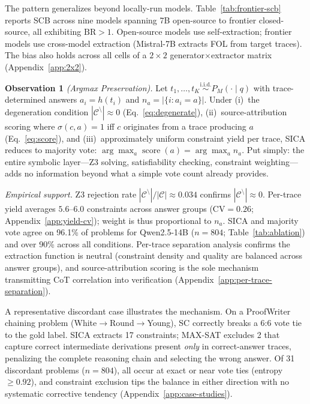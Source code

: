  The pattern generalizes beyond locally-run models. Table~\ref{tab:frontier-scb} reports SCB across nine models spanning 7B open-source to frontier closed-source, all exhibiting $\text{BR} > 1$. Open-source models use self-extraction; frontier models use cross-model extraction (Mistral-7B extracts FOL from target traces). The bias also holds across all cells of a $2{\times}2$ generator${\times}$extractor matrix (Appendix~\ref{app:2x2}).

\smallskip\noindent
\textbf{Observation 1} \textit{(Argmax Preservation).}\;%
Let $t_1, \ldots, t_K \overset{\mathrm{i.i.d.}}{\sim} P_M(\cdot \mid q)$ with trace-determined answers $a_i = h(t_i)$ and $n_a = |\{i : a_i = a\}|$.
Under (i)~the degeneration condition $|\mathcal{C}^{\setminus}| \approx 0$ (Eq.~\ref{eq:degenerate}), (ii)~source-attribution scoring where $\sigma(c,a) {=} 1$ iff $c$ originates from a trace producing $a$ (Eq.~\ref{eq:score}), and (iii)~approximately uniform constraint yield per trace, SICA reduces to majority vote: $\arg\max_a \operatorname{score}(a) = \arg\max_a n_a$.
Put simply: the entire symbolic layer---Z3 solving, satisfiability checking, constraint weighting---adds no information beyond what a simple vote count already provides.

\smallskip\noindent
\textit{Empirical support.}\;%
Z3 rejection rate $|\mathcal{C}^{\setminus}|/|\mathcal{C}| \approx 0.034$ confirms $|\mathcal{C}^{\setminus}| \approx 0$. Per-trace yield averages $5.6$--$6.0$ constraints across answer groups (CV${=}0.26$; Appendix~\ref{app:yield-cv}); weight is thus proportional to $n_a$. SICA and majority vote agree on 96.1\% of problems for Qwen2.5-14B ($n{=}804$; Table~\ref{tab:ablation}) and over 90\% across all conditions. Per-trace separation analysis confirms the extraction function is neutral (constraint density and quality are balanced across answer groups), and source-attribution scoring is the sole mechanism transmitting CoT correlation into verification (Appendix~\ref{app:per-trace-separation}).

 A representative discordant case illustrates the mechanism. On a ProofWriter chaining problem (White$\to$Round$\to$Young), SC correctly breaks a 6:6 vote tie to the gold label. SICA extracts 17 constraints; MAX-SAT excludes 2 that capture correct intermediate derivations present \emph{only} in correct-answer traces, penalizing the complete reasoning chain and selecting the wrong answer. Of 31 discordant problems ($n{=}804$), all occur at exact or near vote ties (entropy $\geq 0.92$), and constraint exclusion tips the balance in either direction with no systematic corrective tendency (Appendix~\ref{app:case-studies}).

